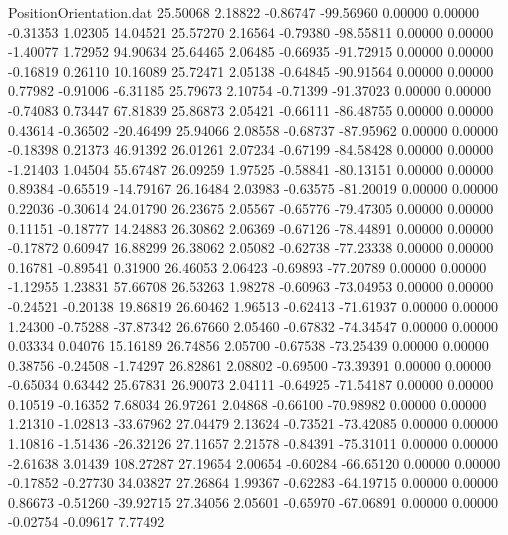 \begin{filecontents}{PositionOrientation.dat}
  25.50068    2.18822   -0.86747   -99.56960    0.00000    0.00000   -0.31353    1.02305   14.04521
  25.57270    2.16564   -0.79380   -98.55811    0.00000    0.00000   -1.40077    1.72952   94.90634
  25.64465    2.06485   -0.66935   -91.72915    0.00000    0.00000   -0.16819    0.26110   10.16089
  25.72471    2.05138   -0.64845   -90.91564    0.00000    0.00000    0.77982   -0.91006   -6.31185
  25.79673    2.10754   -0.71399   -91.37023    0.00000    0.00000   -0.74083    0.73447   67.81839
  25.86873    2.05421   -0.66111   -86.48755    0.00000    0.00000    0.43614   -0.36502  -20.46499
  25.94066    2.08558   -0.68737   -87.95962    0.00000    0.00000   -0.18398    0.21373   46.91392
  26.01261    2.07234   -0.67199   -84.58428    0.00000    0.00000   -1.21403    1.04504   55.67487
  26.09259    1.97525   -0.58841   -80.13151    0.00000    0.00000    0.89384   -0.65519  -14.79167
  26.16484    2.03983   -0.63575   -81.20019    0.00000    0.00000    0.22036   -0.30614   24.01790
  26.23675    2.05567   -0.65776   -79.47305    0.00000    0.00000    0.11151   -0.18777   14.24883
  26.30862    2.06369   -0.67126   -78.44891    0.00000    0.00000   -0.17872    0.60947   16.88299
  26.38062    2.05082   -0.62738   -77.23338    0.00000    0.00000    0.16781   -0.89541    0.31900
  26.46053    2.06423   -0.69893   -77.20789    0.00000    0.00000   -1.12955    1.23831   57.66708
  26.53263    1.98278   -0.60963   -73.04953    0.00000    0.00000   -0.24521   -0.20138   19.86819
  26.60462    1.96513   -0.62413   -71.61937    0.00000    0.00000    1.24300   -0.75288  -37.87342
  26.67660    2.05460   -0.67832   -74.34547    0.00000    0.00000    0.03334    0.04076   15.16189
  26.74856    2.05700   -0.67538   -73.25439    0.00000    0.00000    0.38756   -0.24508   -1.74297
  26.82861    2.08802   -0.69500   -73.39391    0.00000    0.00000   -0.65034    0.63442   25.67831
  26.90073    2.04111   -0.64925   -71.54187    0.00000    0.00000    0.10519   -0.16352    7.68034
  26.97261    2.04868   -0.66100   -70.98982    0.00000    0.00000    1.21310   -1.02813  -33.67962
  27.04479    2.13624   -0.73521   -73.42085    0.00000    0.00000    1.10816   -1.51436  -26.32126
  27.11657    2.21578   -0.84391   -75.31011    0.00000    0.00000   -2.61638    3.01439  108.27287
  27.19654    2.00654   -0.60284   -66.65120    0.00000    0.00000   -0.17852   -0.27730   34.03827
  27.26864    1.99367   -0.62283   -64.19715    0.00000    0.00000    0.86673   -0.51260  -39.92715
  27.34056    2.05601   -0.65970   -67.06891    0.00000    0.00000   -0.02754   -0.09617    7.77492

\end{filecontents}
